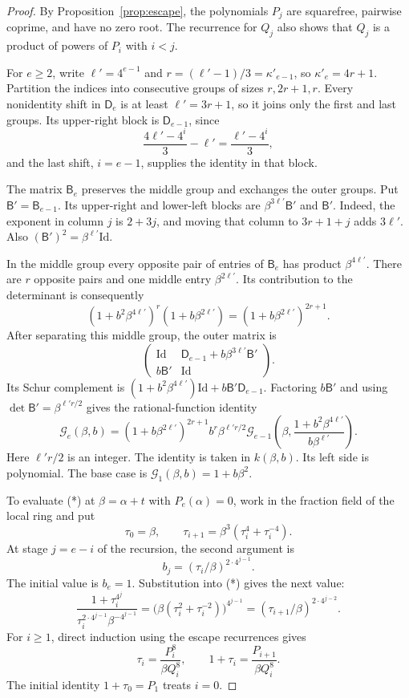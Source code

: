 \documentclass[11pt,a4paper,reqno]{amsart}
\numberwithin{equation}{section}
\theoremstyle{plain}
\theoremstyle{definition}
\theoremstyle{remark}
\newcommand{\Id}{\mathrm{Id}}
\begin{document}
\begin{proof}
By Proposition~\ref{prop:escape}, the polynomials $P_j$ are squarefree,
pairwise coprime, and have no zero root. The recurrence for $Q_j$ also
shows that $Q_j$ is a product of powers of $P_i$ with $i<j$.

For $e\geq2$, write $\ell'=4^{e-1}$ and
$r=(\ell'-1)/3=\kappa'_{e-1}$, so $\kappa'_e=4r+1$.
Partition the indices into consecutive groups of sizes $r,2r+1,r$.
Every nonidentity shift in $\mathsf D_e$ is at least $\ell'=3r+1$,
so it joins only the first and last groups. Its upper-right block is
$\mathsf D_{e-1}$, since
\[
\frac{4\ell'-4^i}{3}-\ell'=\frac{\ell'-4^i}{3},
\]
and the last shift, $i=e-1$, supplies the identity in that block.

The matrix $\mathsf B_e$ preserves the middle group and exchanges the
outer groups. Put $\mathsf B'=\mathsf B_{e-1}$. Its upper-right and
lower-left blocks are $\beta^{3\ell'}\mathsf B'$ and $\mathsf B'$.
Indeed, the exponent in column $j$ is $2+3j$, and moving that column to
$3r+1+j$ adds $3\ell'$. Also
$(\mathsf B')^2=\beta^{\ell'}\Id$.

In the middle group every opposite pair of entries of $\mathsf B_e$ has product $\beta^{4\ell'}$. There are $r$ opposite pairs and one middle entry $\beta^{2\ell'}$. Its contribution to the determinant is consequently
\[
(1+b^2\beta^{4\ell'})^r(1+b\beta^{2\ell'})
=(1+b\beta^{2\ell'})^{2r+1}.
\]
After separating this middle group, the outer matrix is
\[
\begin{pmatrix}\Id&\mathsf D_{e-1}+b\beta^{3\ell'}\mathsf B'\\b\mathsf B'&\Id\end{pmatrix}.
\]
Its Schur complement is $(1+b^2\beta^{4\ell'})\Id+b\mathsf B'\mathsf D_{e-1}$. Factoring $b\mathsf B'$ and using $\det \mathsf B'=\beta^{\ell'r/2}$ gives the rational-function identity
\[
\mathcal G_e(\beta,b)=
(1+b\beta^{2\ell'})^{2r+1}b^r\beta^{\ell'r/2}
\mathcal G_{e-1}\!\left(\beta,\frac{1+b^2\beta^{4\ell'}}{b\beta^{\ell'}}\right).
\tag{*}
\]
Here $\ell'r/2$ is an integer. The identity is taken in $k(\beta,b)$.
Its left side is polynomial. The base case is
$\mathcal G_1(\beta,b)=1+b\beta^2$.

To evaluate (*) at $\beta=\alpha+t$ with $P_e(\alpha)=0$, work in the fraction field of the local ring and put
\[
\tau_0=\beta,\qquad \tau_{i+1}=\beta^3(\tau_i^4+\tau_i^{-4}).
\]
At stage $j=e-i$ of the recursion, the second argument is
\[
b_j=(\tau_i/\beta)^{2\cdot4^{j-1}}.
\]
The initial value is $b_e=1$. Substitution into (*) gives the next value:
\[
\frac{1+\tau_i^{4^j}}{\tau_i^{2\cdot4^{j-1}}\beta^{-4^{j-1}}}
=\bigl(\beta(\tau_i^2+\tau_i^{-2})\bigr)^{4^{j-1}}
=(\tau_{i+1}/\beta)^{2\cdot4^{j-2}}.
\]
For $i\geq1$, direct induction using the escape recurrences gives
\[
\tau_i=\frac{P_i^8}{\beta Q_i^8},\qquad
1+\tau_i=\frac{P_{i+1}}{\beta Q_i^8}.
\]
The initial identity $1+\tau_0=P_1$ treats $i=0$.


\end{proof}
\end{document}
